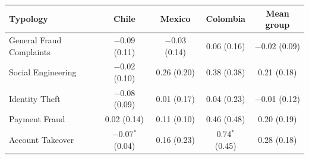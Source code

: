 \begin{tabular}{@{} l cccc @{}}
\toprule
\textbf{Typology} & \textbf{Chile} & \textbf{Mexico} & \textbf{Colombia} & \textbf{Mean group} \\
\midrule
General Fraud Complaints & $-$0.09 (0.11) & $-$0.03 (0.14) & 0.06 (0.16) & $-$0.02 (0.09) \\
Social Engineering & $-$0.02 (0.10) & 0.26 (0.20) & 0.38 (0.38) & 0.21 (0.18) \\
Identity Theft & $-$0.08 (0.09) & 0.01 (0.17) & 0.04 (0.23) & $-$0.01 (0.12) \\
Payment Fraud & 0.02 (0.14) & 0.11 (0.10) & 0.46 (0.48) & 0.20 (0.19) \\
Account Takeover & $-$0.07$^{*}$ (0.04) & 0.16 (0.23) & 0.74$^{*}$ (0.45) & 0.28 (0.18) \\
\bottomrule
\end{tabular}